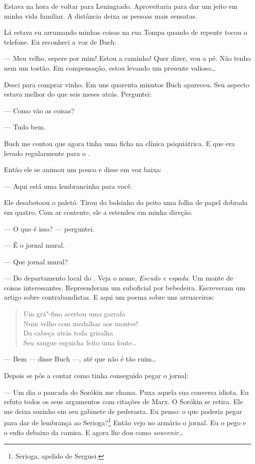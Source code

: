 Estava na hora de voltar para Leningrado. Aproveitaria para dar um jeito
em minha vida familiar. A distância deixa as pessoas mais sensatas.

Lá estava eu arrumando minhas coisas na rua Tompa quando de repente
tocou o telefone. Eu reconheci a voz de Buch:

--- Meu velho, espere por mim! Estou a caminho! Quer dizer, vou a pé.
Não tenho nem um tostão. Em compensação, estou levando um presente
valioso\ldots{}

Desci para comprar vinho. Em uns quarenta minutos Buch apareceu. Seu
aspecto estava melhor do que seis meses atrás. Perguntei:

--- Como vão as coisas?

--- Tudo bem.

Buch me contou que agora tinha uma ficha na clínica psiquiátrica. E que
era levado regularmente para o .

Então ele se animou um pouco e disse em voz baixa:

--- Aqui está uma lembrancinha para você.

Ele desabotoou o paletó. Tirou do bolsinho do peito uma folha de papel
dobrada em quatro. Com ar contente, ele a estendeu em minha direção.

--- O que é isso? --- perguntei.

--- É o jornal mural.

--- Que jornal mural?

--- Do departamento local do . Veja o nome, \emph{Escudo e espada}.
Um monte de coisas interessantes. Repreenderam um suboficial por
bebedeira. Escreveram um artigo sobre contrabandistas. E aqui um poema
sobre uns arruaceiros:

\begin{verse}
Um grã"-fino acertou uma garrafa\\
Num velho com medalhas aos montes!\\
Da cabeça atrás toda grisalha\\
Seu sangue esguicha feito uma fonte\ldots{}
\end{verse}

--- Bem --- disse Buch ---, até que não é tão ruim\ldots{}

Depois se pôs a contar como tinha conseguido pegar o jornal:

--- Um dia o pancada do Sorókin me chama. Puxa aquela sua conversa
idiota. Eu refuto todos os seus argumentos com citações de Marx. O
Sorókin se retira. Ele me deixa sozinho em seu gabinete de pederasta. Eu
penso: o que poderia pegar para dar de lembrança ao Serioga?\footnote{Serioga,
  apelido de Serguei.} Então vejo no armário o jornal. Eu o pego e o
enfio debaixo da camisa. E agora lhe dou como \emph{souvenir}\ldots{}

